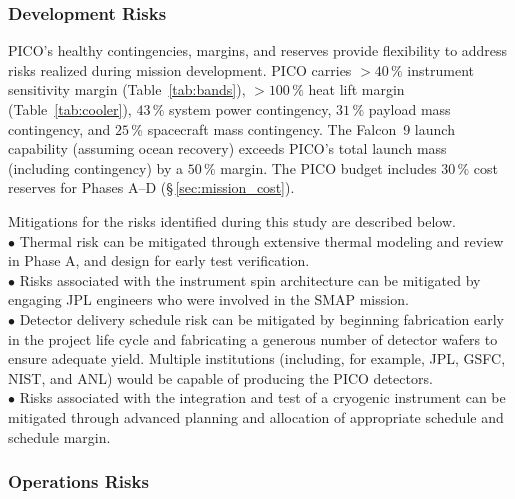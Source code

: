 \subsubsection{Development Risks}
\label{sec:development_risks} %

PICO's healthy contingencies, margins, and reserves provide
flexibility to address risks realized during mission development. PICO
carries $>40\,\%$ instrument sensitivity margin (Table~\ref{tab:bands}),
$>100\,\%$ heat lift margin (Table~\ref{tab:cooler}), $43\,\%$ system
power contingency, $31\,\%$ payload mass contingency, and $25\,\%$
spacecraft mass contingency. The Falcon~9 launch capability (assuming ocean
recovery) exceeds PICO's total launch mass (including contingency) by
a $50\,\%$ margin. The PICO budget includes $30\,\%$ cost
reserves for Phases A--D (\S\,\ref{sec:mission_cost}).

Mitigations for %
the risks identified during this study are described below. \\
$\bullet$ \hspace{0.05in} Thermal risk can be mitigated through extensive thermal modeling and
review in Phase A, and design for early test verification. \\
$\bullet$ \hspace{0.05in} Risks associated with the instrument spin architecture can be mitigated by engaging JPL engineers who were involved in the SMAP mission. \\
$\bullet$ \hspace{0.05in} Detector delivery schedule risk can be mitigated by beginning fabrication early in the project life cycle and fabricating a generous number of detector wafers to ensure adequate yield. Multiple institutions (including, for example, JPL, GSFC, NIST, and ANL) would be capable of producing the PICO detectors. \\
$\bullet$ \hspace{0.05in} Risks associated with the integration and test of a cryogenic instrument can be mitigated through advanced planning and allocation of appropriate schedule and schedule margin.


\subsubsection{Operations Risks}
\label{sec:operations_risks} %

